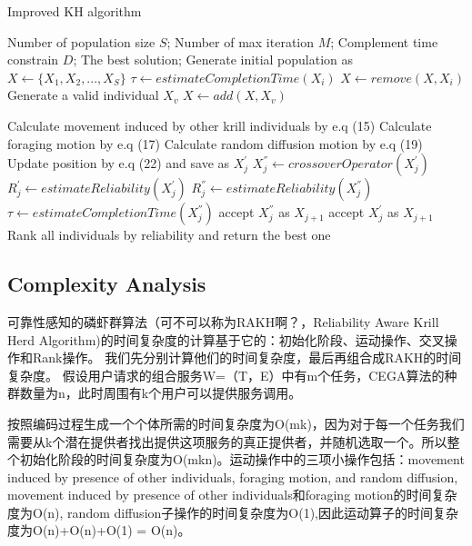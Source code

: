 \documentclass[journal]{IEEEtran}
\begin{document}
\begin{algorithm}
\caption{Improved KH algorithm}
\label{alg2}
\begin{algorithmic}[1]

\REQUIRE Number of population size $S$; Number of max iteration $M$; Complement time constrain $D$;
\ENSURE The best solution;
\STATE Generate initial population as $X \leftarrow \{X_1, X_2, ..., X_{S}\}$
  \STATE $\tau \leftarrow estimateCompletionTime(X_i)$
      \STATE $X \leftarrow remove(X, X_i)$
      \STATE Generate a valid individual $X_v$
      \STATE $X \leftarrow add(X, X_v)$
  \ENDIF
\ENDFOR


    \STATE Calculate movement induced by other krill individuals by e.q (15)
    \STATE Calculate foraging motion by e.q (17)
    \STATE Calculate random diffusion motion by e.q (19)
    \STATE Update position by e.q (22) and save as $X_j^{'}$
    \STATE $X_j^{''} \leftarrow crossoverOperator(X_j^{'})$
    \STATE $R_j^{'} \leftarrow estimateReliability(X_j^{'})$
    \STATE $R_j^{''} \leftarrow estimateReliability(X_j^{''})$
    \STATE $\tau \leftarrow estimateCompletionTime(X_j^{''})$
      \STATE accept $X_j^{''}$ as $X_{j+1}$
    \ELSE
      \STATE accept $X_j^{'}$ as $X_{j+1}$
    \ENDIF
  \ENDFOR
\ENDFOR
\STATE Rank all individuals by reliability and return the best one
\end{algorithmic}
\end{algorithm}

\subsection{Complexity Analysis}
可靠性感知的磷虾群算法（可不可以称为RAKH啊？，Reliability Aware Krill Herd Algorithm)的时间复杂度的计算基于它的：初始化阶段、运动操作、交叉操作和Rank操作。
我们先分别计算他们的时间复杂度，最后再组合成RAKH的时间复杂度。
假设用户请求的组合服务W=（T，E）中有m个任务，CEGA算法的种群数量为n，此时周围有k个用户可以提供服务调用。

按照编码过程生成一个个体所需的时间复杂度为O(mk)，因为对于每一个任务我们需要从k个潜在提供者找出提供这项服务的真正提供者，并随机选取一个。所以整个初始化阶段的时间复杂度为O(mkn)。运动操作中的三项小操作包括：movement induced by presence of other individuals, foraging motion, and random diffusion, movement induced by presence of other individuals和foraging motion的时间复杂度为O(n), random diffusion子操作的时间复杂度为O(1),因此运动算子的时间复杂度为O(n)+O(n)+O(1) = O(n)。
\end{document}
